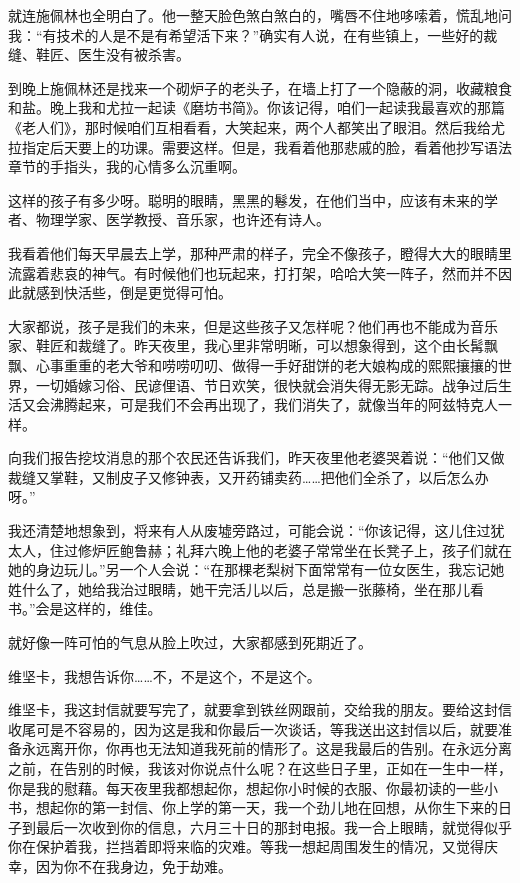 就连施佩林也全明白了。他一整天脸色煞白煞白的，嘴唇不住地哆嗦着，慌乱地问我：“有技术的人是不是有希望活下来？”确实有人说，在有些镇上，一些好的裁缝、鞋匠、医生没有被杀害。

到晚上施佩林还是找来一个砌炉子的老头子，在墙上打了一个隐蔽的洞，收藏粮食和盐。晚上我和尤拉一起读《磨坊书简》。你该记得，咱们一起读我最喜欢的那篇《老人们》，那时候咱们互相看看，大笑起来，两个人都笑出了眼泪。然后我给尤拉指定后天要上的功课。需要这样。但是，我看着他那悲戚的脸，看着他抄写语法章节的手指头，我的心情多么沉重啊。

这样的孩子有多少呀。聪明的眼睛，黑黑的鬈发，在他们当中，应该有未来的学者、物理学家、医学教授、音乐家，也许还有诗人。

我看着他们每天早晨去上学，那种严肃的样子，完全不像孩子，瞪得大大的眼睛里流露着悲哀的神气。有时候他们也玩起来，打打架，哈哈大笑一阵子，然而并不因此就感到快活些，倒是更觉得可怕。

大家都说，孩子是我们的未来，但是这些孩子又怎样呢？他们再也不能成为音乐家、鞋匠和裁缝了。昨天夜里，我心里非常明晰，可以想象得到，这个由长髯飘飘、心事重重的老大爷和唠唠叨叨、做得一手好甜饼的老大娘构成的熙熙攘攘的世界，一切婚嫁习俗、民谚俚语、节日欢笑，很快就会消失得无影无踪。战争过后生活又会沸腾起来，可是我们不会再出现了，我们消失了，就像当年的阿兹特克人一样。

向我们报告挖坟消息的那个农民还告诉我们，昨天夜里他老婆哭着说：“他们又做裁缝又掌鞋，又制皮子又修钟表，又开药铺卖药……把他们全杀了，以后怎么办呀。”

我还清楚地想象到，将来有人从废墟旁路过，可能会说：“你该记得，这儿住过犹太人，住过修炉匠鲍鲁赫；礼拜六晚上他的老婆子常常坐在长凳子上，孩子们就在她的身边玩儿。”另一个人会说：“在那棵老梨树下面常常有一位女医生，我忘记她姓什么了，她给我治过眼睛，她干完活儿以后，总是搬一张藤椅，坐在那儿看书。”会是这样的，维佳。

就好像一阵可怕的气息从脸上吹过，大家都感到死期近了。

维坚卡，我想告诉你……不，不是这个，不是这个。

维坚卡，我这封信就要写完了，就要拿到铁丝网跟前，交给我的朋友。要给这封信收尾可是不容易的，因为这是我和你最后一次谈话，等我送出这封信以后，就要准备永远离开你，你再也无法知道我死前的情形了。这是我最后的告别。在永远分离之前，在告别的时候，我该对你说点什么呢？在这些日子里，正如在一生中一样，你是我的慰藉。每天夜里我都想起你，想起你小时候的衣服、你最初读的一些小书，想起你的第一封信、你上学的第一天，我一个劲儿地在回想，从你生下来的日子到最后一次收到你的信息，六月三十日的那封电报。我一合上眼睛，就觉得似乎你在保护着我，拦挡着即将来临的灾难。等我一想起周围发生的情况，又觉得庆幸，因为你不在我身边，免于劫难。

